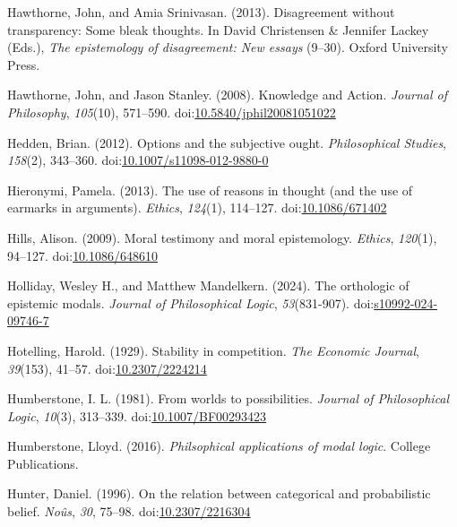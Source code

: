 \documentclass[
  10pt,
  letterpaper,
  twoside]{scrbook}
\newlength{\cslhangindent}
\newenvironment{CSLReferences}[2] %
 {\begin{list}{}{%
  \setlength{\itemindent}{0pt}
  \setlength{\leftmargin}{0pt}
  \setlength{\parsep}{0pt}
  \ifodd #1
   \setlength{\leftmargin}{\cslhangindent}
   \setlength{\itemindent}{-1\cslhangindent}
  \fi
  \setlength{\itemsep}{#2\baselineskip}}}
 {\end{list}}
\begin{document}
\begin{CSLReferences}{1}{0}
Hawthorne, John, and Amia Srinivasan. (2013). Disagreement without
transparency: Some bleak thoughts. In David Christensen \& Jennifer
Lackey (Eds.), \emph{The epistemology of disagreement: New essays}
(9--30). Oxford University Press.

Hawthorne, John, and Jason Stanley. (2008). {Knowledge and Action}.
\emph{Journal of Philosophy}, \emph{105}(10), 571--590.
doi:\href{https://doi.org/10.5840/jphil20081051022}{10.5840/jphil20081051022}

Hedden, Brian. (2012). Options and the subjective ought.
\emph{Philosophical Studies}, \emph{158}(2), 343--360.
doi:\href{https://doi.org/10.1007/s11098-012-9880-0}{10.1007/s11098-012-9880-0}

Hieronymi, Pamela. (2013). The use of reasons in thought (and the use of
earmarks in arguments). \emph{Ethics}, \emph{124}(1), 114--127.
doi:\href{https://doi.org/10.1086/671402}{10.1086/671402}

Hills, Alison. (2009). Moral testimony and moral epistemology.
\emph{Ethics}, \emph{120}(1), 94--127.
doi:\href{https://doi.org/10.1086/648610}{10.1086/648610}

Holliday, Wesley H., and Matthew Mandelkern. (2024). The orthologic of
epistemic modals. \emph{Journal of Philosophical Logic},
\emph{53}(831-907).
doi:\href{https://doi.org/s10992-024-09746-7}{s10992-024-09746-7}

Hotelling, Harold. (1929). Stability in competition. \emph{The Economic
Journal}, \emph{39}(153), 41--57.
doi:\href{https://doi.org/10.2307/2224214}{10.2307/2224214}

Humberstone, I. L. (1981). From worlds to possibilities. \emph{Journal
of Philosophical Logic}, \emph{10}(3), 313--339.
doi:\href{https://doi.org/10.1007/BF00293423}{10.1007/BF00293423}

Humberstone, Lloyd. (2016). \emph{Philsophical applications of modal
logic}. College Publications.

Hunter, Daniel. (1996). On the relation between categorical and
probabilistic belief. \emph{No{û}s}, \emph{30}, 75--98.
doi:\href{https://doi.org/10.2307/2216304}{10.2307/2216304}


\end{CSLReferences}
\end{document}
